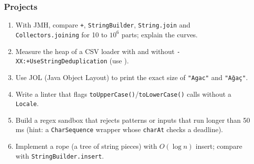 \documentclass[aspectratio=169,10pt,compress]{beamer}
\begin{document}
\begin{frame}[t,fragile] \frametitle{Projects}
  \begin{enumerate}\small
    \item With JMH, compare \texttt{+}, \texttt{StringBuilder}, \texttt{String.join} and \texttt{Collectors.joining}
          for 10 to $10^{6}$ parts; explain the curves.
    \item Measure the heap of a CSV loader with and without \texttt{-XX:+UseStringDeduplication} (use ).
    \item Use JOL (Java Object Layout) to print the exact size of \texttt{"Agac"} and \texttt{"Ağaç"}.
    \item Write a linter that flags \texttt{toUpperCase()}/\texttt{toLowerCase()} calls without a \texttt{Locale}.
    \item Build a regex sandbox that rejects patterns or inputs that run longer than 50\,ms
          (hint: a \texttt{CharSequence} wrapper whose \texttt{charAt} checks a deadline).
    \item Implement a rope (a tree of string pieces) with $O(\log n)$ insert; compare with \texttt{StringBuilder.insert}.
  \end{enumerate}
\end{frame}




\begin{frame}[t,fragile]
	\begin{center}
		\vspace{4cm}
	\end{center}
\end{frame}
\end{document}
